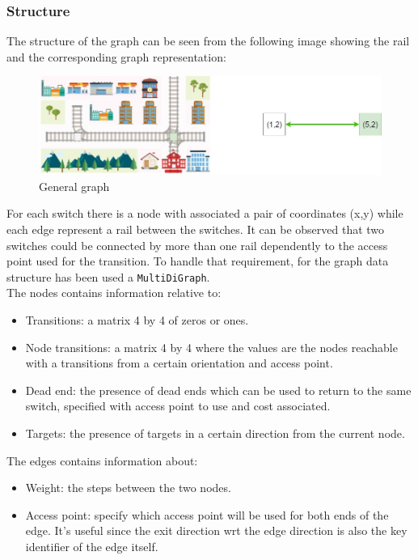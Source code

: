 \subsubsection{Structure}
The structure of the graph can be seen from the following image showing the rail and the corresponding graph representation:
\begin{figure}[H] 
\includegraphics[scale=0.45]{figures/general-graph.jpg}
\centering
\caption{General graph}
\end{figure}
For each switch there is a node with associated a pair of coordinates (x,y) while each edge represent a rail between the switches. It can be observed that two switches could be connected by more than one rail dependently to the access point used for the transition. To handle that requirement, for the graph data structure has been used a \texttt{MultiDiGraph}.\\
The nodes contains information relative to:
\begin{itemize}
    \item Transitions: a matrix 4 by 4 of zeros or ones.
    \item Node transitions: a matrix 4 by 4 where the values are the nodes reachable with a transitions from a certain orientation and access point.
    \item Dead end: the presence of dead ends which can be used to return to the same switch, specified with access point to use and cost associated.
    \item Targets: the presence of targets in a certain direction from the current node.
\end{itemize}
The edges contains information about:
\begin{itemize}
    \item Weight: the steps between the two nodes.
    \item Access point: specify which access point will be used for both ends of the edge. It's useful since the exit direction wrt the edge direction is also the key identifier of the edge itself.
\end{itemize}

